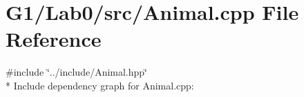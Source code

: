 \section{G1/\+Lab0/src/\+Animal.cpp File Reference}
\label{_animal_8cpp}
{\ttfamily \#include \char`\"{}../include/\+Animal.\+hpp\char`\"{}}\\*
Include dependency graph for Animal.\+cpp\+:
